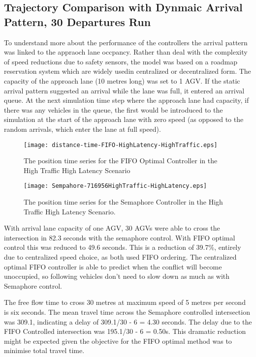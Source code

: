 \subsection{Trajectory Comparison with Dynmaic Arrival Pattern, 30 Departures Run}
\label{sec:mutex_arrival_pattern}
To understand more about the performance of the controllers the arrival pattern was linked to the appraoch lane occpancy. Rather than deal with the complexity of speed reductions due to safety sensors, the model was based on a roadmap reservation system which are widely usedin centralized or decentralized form. The capacity of the approach lane (10 metres long) was set to 1 AGV. If the static arrival pattern suggested an arrival while the lane was full, it entered an arrival queue. At the next simulation time step where the approach lane had capacity, if there was any vehicles in the queue, the first would be introduced to the simulation at the start of the approach lane with zero speed (as opposed to the random arrivals, which enter the lane at full speed).  
\begin{figure}
	\texttt{[image: distance-time-FIFO-HighLatency-HighTraffic.eps]}
	\caption{The position time series for the FIFO Optimal Controller in the High Traffic High Latency Scenario}
	\label{fig:optimal_fifo_st_HL_HT}       %
\end{figure}
\begin{figure}
	\texttt{[image: Sempahore-716956HighTraffic-HighLatency.eps]}
	\caption{The position time series for the Semaphore Controller in the High Traffic High Latency Scenario.}
	\label{fig:semaphore_st_HL_HT}       %
\end{figure}

With arrival lane capacity of one AGV, 30 AGVs were able to cross the intersection in 82.3 seconds with the semaphore control. With FIFO optimal control this was reduced to 49.6 seconds. This is a reduction of 39.7\%, entirely due to centralized speed choice, as both used FIFO ordering. The centralized optimal FIFO controller is able to predict when the conflict will become unoccupied, so following vehicles don't need to slow down as much as with Semaphore control. 

The free flow time to cross 30 metres at maximum speed of 5 metres per second is six seconds. The mean travel time across the Semaphore controlled intersection was 309.1, indicating a delay of 309.1/30 - 6 = 4.30 seconds. The delay due to the FIFO Controlled intersection was 195.1/30 - 6 = 0.50s. This dramatic reduction might be expected given the objective for the FIFO optimal method was to minimise total travel time.   

